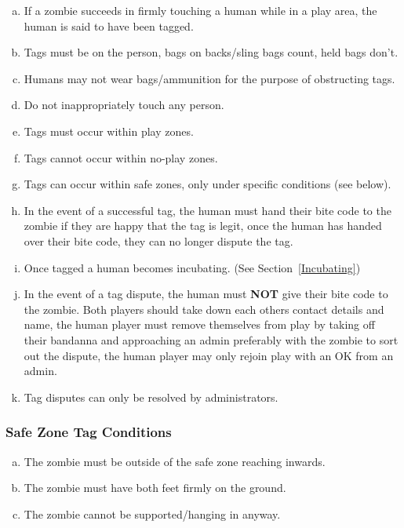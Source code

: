 \documentclass[a4paper,12pt]{article}
\begin{document}
\begin{enumerate}[(a)]
    \item If a zombie succeeds in firmly touching a human while in a  play area, the human is said to have been tagged.
    \item Tags must be on the person, bags on backs/sling bags count, held bags don't.
    \item Humans may not wear bags/ammunition for the purpose of obstructing tags.
    \item Do not inappropriately touch any person.
    \item Tags must occur within play zones.
    \item Tags cannot occur within no-play zones.
    \item Tags can occur within safe zones, only under specific conditions (see below). 
    \item In the event of a successful tag, the human must hand their bite code to the zombie if they are happy that the tag is legit, once the human has handed over their bite code, they can no longer dispute the tag.    
    \item Once tagged a human becomes incubating. (See Section~\ref{Incubating})
    \item In the event of a tag dispute, the human must {\bf NOT} give their bite code to the zombie. Both players should take down each others contact details and name, the human player must remove themselves from play by taking off their bandanna and approaching an admin preferably with the zombie to sort out the dispute, the human player may only rejoin play with an OK from an admin.
    \item Tag disputes can only be resolved by administrators.   
\end{enumerate}

\subsubsection{Safe Zone Tag Conditions}

\begin{enumerate}[(a)]
    \item The zombie must be outside of the safe zone reaching inwards.
    \item The zombie must have both feet firmly on the ground.  
    \item The zombie cannot be supported/hanging in anyway.
\end{enumerate}
\end{document}
